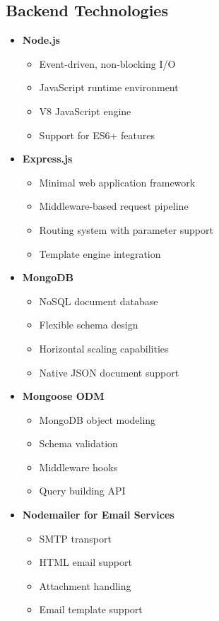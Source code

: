 \documentclass[12pt,a4paper]{article}
\begin{document}
\subsection{Backend Technologies}
\begin{multicols}{2}
\begin{itemize}
    \item \textbf{Node.js}
    \begin{itemize}
        \item Event-driven, non-blocking I/O
        \item JavaScript runtime environment
        \item V8 JavaScript engine
        \item Support for ES6+ features
    \end{itemize}
    
    \item \textbf{Express.js}
    \begin{itemize}
        \item Minimal web application framework
        \item Middleware-based request pipeline
        \item Routing system with parameter support
        \item Template engine integration
    \end{itemize}
    
    \item \textbf{MongoDB}
    \begin{itemize}
        \item NoSQL document database
        \item Flexible schema design
        \item Horizontal scaling capabilities
        \item Native JSON document support
    \end{itemize}
    
    \item \textbf{Mongoose ODM}
    \begin{itemize}
        \item MongoDB object modeling
        \item Schema validation
        \item Middleware hooks
        \item Query building API
    \end{itemize}
    
    \item \textbf{Nodemailer for Email Services}
    \begin{itemize}
        \item SMTP transport
        \item HTML email support
        \item Attachment handling
        \item Email template support
    \end{itemize}
    

\end{itemize}
\end{multicols}
\end{document}
